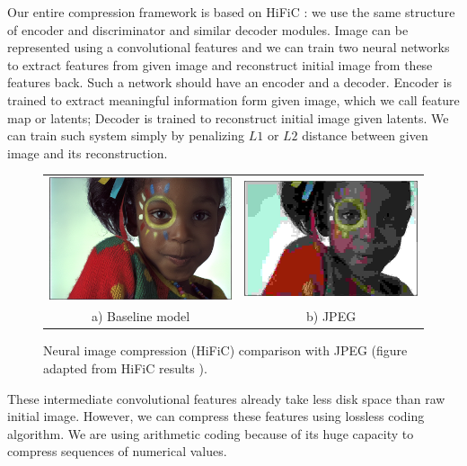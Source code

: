Our entire compression framework is based on HiFiC \cite{mentzer_high_fidelity_2020}: we use the same structure of encoder and discriminator and similar decoder modules. Image can be represented using a convolutional features and we can train two neural networks to extract features from given image and reconstruct initial image from these features back. Such a network should have an encoder and a decoder. Encoder is trained to extract meaningful information form given image, which we call feature map or latents; Decoder is trained to reconstruct initial image given latents. We can train such system simply by penalizing $L1$ or $L2$ distance between given image and its reconstruction.

\begin{figure}[!ht]
    \centering
    \begin{tabular}{cc}
        \includegraphics[width=.45\textwidth]{figure/kodim15_HiFiC_Lo.png} & \includegraphics[width=.45\textwidth]{figure/kodim15_jpg_1x_0.166.jpg} \\
        a) Baseline model                                                  & b) JPEG
    \end{tabular}
    \caption{Neural image compression (HiFiC) comparison with JPEG (figure adapted from HiFiC results \cite{mentzer_high_fidelity_2020}).}
    \label{jpeg-hific-comparision}
\end{figure}

These intermediate convolutional features already take less disk space than raw initial image. However, we can compress these features using lossless coding algorithm. We are using arithmetic coding because of its huge capacity to compress sequences of numerical values.

